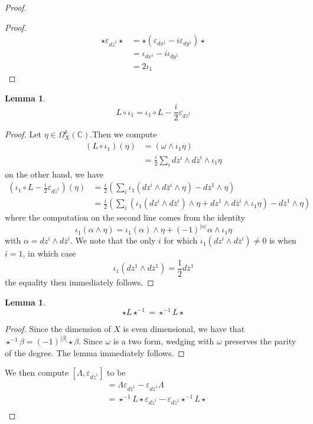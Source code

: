 \documentclass[psamsfonts, 12pt]{amsart}
\newtheorem{lem}[thm]{Lemma}
\theoremstyle{definition}
\theoremstyle{remark}
\newcommand{\C}{\mathbb{C}}
\newcommand{\zbar}{\overline{z}}
\newcommand{\inv}{^{-1}}
\begin{document}
\begin{proof}
\begin{proof}
\begin{align*}
\star\varepsilon_{d\zbar^1}\star
&= \star(\varepsilon_{dx^1} -i\varepsilon_{dy^1})\star  \\
&= \iota_{dx^1} - i\iota_{dy^1} \\
&= 2\iota_1
\end{align*}
\end{proof}
%
\begin{lem}
\[
L\circ\iota_1 = \iota_1\circ L - \frac{i}{2}\varepsilon_{d\zbar^1}
\]
\end{lem}
%
\begin{proof}
Let $\eta \in \Omega^k_X(\C)$.Then we compute
\begin{align*}
(L\circ\iota_1)(\eta) &= (\omega\wedge\iota_1\eta) \\
&= \frac{i}{2}\sum_i dz^i\wedge d\zbar^i \wedge\iota_1\eta
\end{align*}
on the other hand, we have
\begin{align*}
(\iota_1\circ L - \frac{i}{2}\varepsilon_{d\zbar^1})(\eta)
&= \frac{i}{2}\left(\sum_i \iota_1(dz^i\wedge d\zbar^i\wedge\eta)
- d\zbar^1\wedge\eta\right) \\
&= \frac{i}{2}\left(\sum_i (\iota_1(dz^i\wedge d\zbar^i)\wedge\eta + dz^1\wedge
d\zbar^i\wedge\iota_1\eta) - d\zbar^1\wedge\eta\right)
\end{align*}
where the computation on the second line comes from the identity
\[
\iota_1(\alpha \wedge \eta) = \iota_1(\alpha)\wedge\eta
+ (-1)^{|\alpha|} \alpha\wedge\iota_1\eta
\]
with $\alpha = dz^i\wedge d\zbar^i$. We note that the only $i$ for which
 $\iota_1(dz^i\wedge d\zbar^i) \neq 0$ is when $i=1$,
in which case
\[
\iota_1(dz^1\wedge d\zbar^1) = \frac{1}{2} d\zbar^1
\]
the equality then immediately follows.
\end{proof}
%
\begin{lem}
\[
\star L\star\inv = \star\inv L\star
\]
\end{lem}
%
\begin{proof}
Since the dimension of $X$ is even dimensional, we have that
$\star\inv\beta = (-1)^{|\beta|}\star\beta$. Since $\omega$ is a two form, wedging
with $\omega$ preserves the parity of the degree. The lemma immediately follows.
\end{proof}
%
We then compute $[\Lambda,\varepsilon_{d\zbar^1}]$ to be
\begin{align*}
[\Lambda,\varepsilon_{d\zbar^1}]
&= \Lambda\varepsilon_{d\zbar^1} - \varepsilon_{d\zbar^1}\Lambda \\
&= \star\inv L\star\varepsilon_{d\zbar^1} - \varepsilon_{d\zbar^1}\star\inv L\star \\

\end{align*}
\end{proof}
\end{document}
